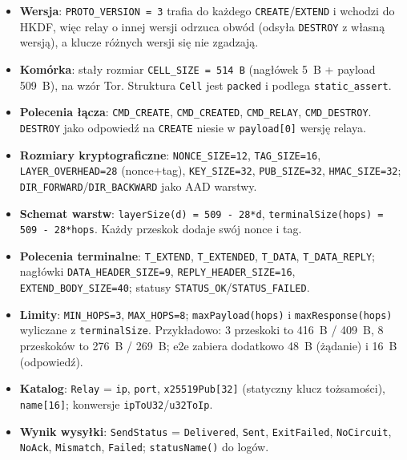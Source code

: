 \documentclass[thesis=inz,faculty=ee]{EE-dyplom}
\begin{document}
    \begin{itemize}
        \item \textbf{Wersja}: \texttt{PROTO\_VERSION = 3} trafia do każdego \texttt{CREATE}/\texttt{EXTEND} i wchodzi do HKDF, więc relay o innej wersji odrzuca obwód 
        (odsyła \texttt{DESTROY} z własną wersją), a klucze różnych wersji się nie zgadzają.
        \item \textbf{Komórka}: stały rozmiar \texttt{CELL\_SIZE = 514~B} (nagłówek 5~B + payload 509~B), na wzór Tor. Struktura \texttt{Cell} jest \texttt{packed} i 
        podlega \texttt{static\_assert}.
        \item \textbf{Polecenia łącza}: \texttt{CMD\_CREATE}, \texttt{CMD\_CREATED}, \texttt{CMD\_RELAY}, \texttt{CMD\_DESTROY}. \texttt{DESTROY} jako odpowiedź na 
        \texttt{CREATE} niesie w \texttt{payload[0]} wersję relaya.
        \item \textbf{Rozmiary kryptograficzne}: \texttt{NONCE\_SIZE=12}, \texttt{TAG\_SIZE=16}, \texttt{LAYER\_OVERHEAD=28} (nonce+tag), \texttt{KEY\_SIZE=32}, 
        \texttt{PUB\_SIZE=32}, \texttt{HMAC\_SIZE=32}; \texttt{DIR\_FORWARD}/\texttt{DIR\_BACKWARD} jako AAD warstwy.
        \item \textbf{Schemat warstw}: \texttt{layerSize(d) = 509 - 28*d}, \texttt{terminalSize(hops) = 509 - 28*hops}. Każdy przeskok dodaje swój nonce i tag.
        \item \textbf{Polecenia terminalne}: \texttt{T\_EXTEND}, \texttt{T\_EXTENDED}, \texttt{T\_DATA}, \texttt{T\_DATA\_REPLY}; nagłówki \texttt{DATA\_HEADER\_SIZE=9}, 
        \texttt{REPLY\_HEADER\_SIZE=16}, \texttt{EXTEND\_BODY\_SIZE=40}; statusy \texttt{STATUS\_OK}/\texttt{STATUS\_FAILED}.
        \item \textbf{Limity}: \texttt{MIN\_HOPS=3}, \texttt{MAX\_HOPS=8}; \texttt{maxPayload(hops)} i \texttt{maxResponse(hops)} wyliczane z \texttt{terminalSize}. 
        Przykładowo: 3 przeskoki to 416~B / 409~B, 8 przeskoków to 276~B / 269~B; e2e zabiera dodatkowo 48~B (żądanie) i 16~B (odpowiedź).
        \item \textbf{Katalog}: \texttt{Relay} = \texttt{ip}, \texttt{port}, \texttt{x25519Pub[32]} (statyczny klucz tożsamości), \texttt{name[16]}; konwersje 
        \texttt{ipToU32}/\texttt{u32ToIp}.
        \item \textbf{Wynik wysyłki}: \texttt{SendStatus} = \texttt{Delivered}, \texttt{Sent}, \texttt{ExitFailed}, \texttt{NoCircuit}, \texttt{NoAck}, \texttt{Mismatch}, 
        \texttt{Failed}; \texttt{statusName()} do logów.
    \end{itemize}
\end{document}
